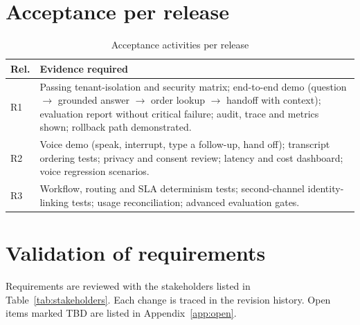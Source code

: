 \section{Acceptance per release}
\begin{table}[htbp]
\centering\caption{Acceptance activities per release}\label{tab:acc-release}
\begin{tabular}{@{}p{1.2cm}p{14.8cm}@{}}
\toprule \textbf{Rel.} & \textbf{Evidence required} \\ \midrule
R1 & Passing tenant-isolation and security matrix; end-to-end demo (question $\rightarrow$ grounded answer $\rightarrow$ order lookup $\rightarrow$ handoff with context); evaluation report without critical failure; audit, trace and metrics shown; rollback path demonstrated. \\
R2 & Voice demo (speak, interrupt, type a follow-up, hand off); transcript ordering tests; privacy and consent review; latency and cost dashboard; voice regression scenarios. \\
R3 & Workflow, routing and SLA determinism tests; second-channel identity-linking tests; usage reconciliation; advanced evaluation gates. \\
\bottomrule
\end{tabular}
\end{table}

\section{Validation of requirements}
Requirements are reviewed with the stakeholders listed in Table~\ref{tab:stakeholders}. Each change is traced in the revision history. Open items marked TBD are listed in Appendix~\ref{app:open}.
